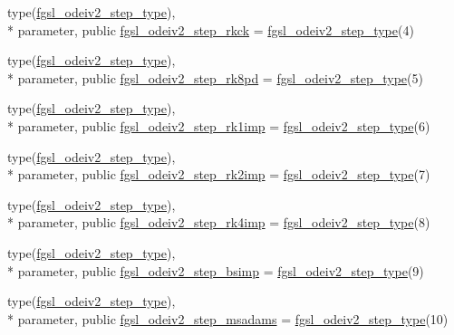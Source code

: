 \begin{DoxyCompactItemize}
\item 
type(\hyperlink{structfgsl_1_1fgsl__odeiv2__step__type}{fgsl\-\_\-odeiv2\-\_\-step\-\_\-type}), \\*
parameter, public \hyperlink{classfgsl_a18b4edbca94c0c9d60fbadc94d1d4964}{fgsl\-\_\-odeiv2\-\_\-step\-\_\-rkck} = \hyperlink{structfgsl_1_1fgsl__odeiv2__step__type}{fgsl\-\_\-odeiv2\-\_\-step\-\_\-type}(4)
\item 
type(\hyperlink{structfgsl_1_1fgsl__odeiv2__step__type}{fgsl\-\_\-odeiv2\-\_\-step\-\_\-type}), \\*
parameter, public \hyperlink{classfgsl_aa7c82f7503be3be3ab81991a3e8eb719}{fgsl\-\_\-odeiv2\-\_\-step\-\_\-rk8pd} = \hyperlink{structfgsl_1_1fgsl__odeiv2__step__type}{fgsl\-\_\-odeiv2\-\_\-step\-\_\-type}(5)
\item 
type(\hyperlink{structfgsl_1_1fgsl__odeiv2__step__type}{fgsl\-\_\-odeiv2\-\_\-step\-\_\-type}), \\*
parameter, public \hyperlink{classfgsl_ae903b3c5e98a84868123fcf7f45cdf11}{fgsl\-\_\-odeiv2\-\_\-step\-\_\-rk1imp} = \hyperlink{structfgsl_1_1fgsl__odeiv2__step__type}{fgsl\-\_\-odeiv2\-\_\-step\-\_\-type}(6)
\item 
type(\hyperlink{structfgsl_1_1fgsl__odeiv2__step__type}{fgsl\-\_\-odeiv2\-\_\-step\-\_\-type}), \\*
parameter, public \hyperlink{classfgsl_a7b4cc51dc91d507009b26f542f372bbd}{fgsl\-\_\-odeiv2\-\_\-step\-\_\-rk2imp} = \hyperlink{structfgsl_1_1fgsl__odeiv2__step__type}{fgsl\-\_\-odeiv2\-\_\-step\-\_\-type}(7)
\item 
type(\hyperlink{structfgsl_1_1fgsl__odeiv2__step__type}{fgsl\-\_\-odeiv2\-\_\-step\-\_\-type}), \\*
parameter, public \hyperlink{classfgsl_ac791c6691e1ebeae5e10c234a26737df}{fgsl\-\_\-odeiv2\-\_\-step\-\_\-rk4imp} = \hyperlink{structfgsl_1_1fgsl__odeiv2__step__type}{fgsl\-\_\-odeiv2\-\_\-step\-\_\-type}(8)
\item 
type(\hyperlink{structfgsl_1_1fgsl__odeiv2__step__type}{fgsl\-\_\-odeiv2\-\_\-step\-\_\-type}), \\*
parameter, public \hyperlink{classfgsl_a6c2cfecdf8c9901ed22feb4c9fdef384}{fgsl\-\_\-odeiv2\-\_\-step\-\_\-bsimp} = \hyperlink{structfgsl_1_1fgsl__odeiv2__step__type}{fgsl\-\_\-odeiv2\-\_\-step\-\_\-type}(9)
\item 
type(\hyperlink{structfgsl_1_1fgsl__odeiv2__step__type}{fgsl\-\_\-odeiv2\-\_\-step\-\_\-type}), \\*
parameter, public \hyperlink{classfgsl_a2cdba04e438cd75d8a78612215dcc5bc}{fgsl\-\_\-odeiv2\-\_\-step\-\_\-msadams} = \hyperlink{structfgsl_1_1fgsl__odeiv2__step__type}{fgsl\-\_\-odeiv2\-\_\-step\-\_\-type}(10)

\end{DoxyCompactItemize}
